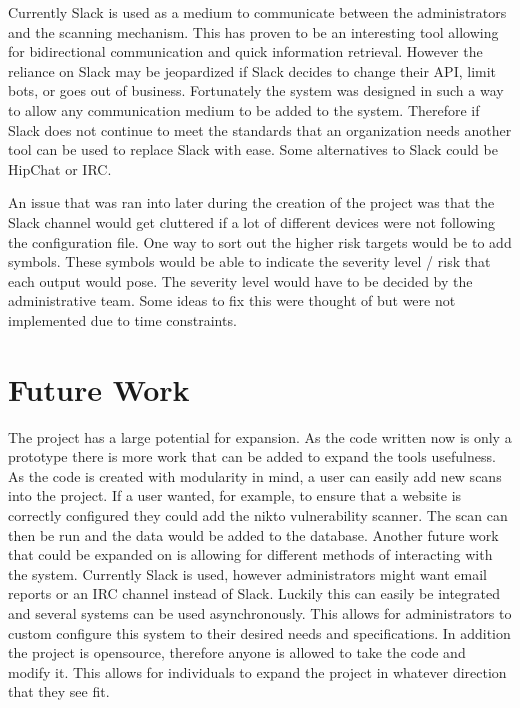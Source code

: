 \documentclass[12pt]{article}
\begin{document}
Currently Slack is used as a medium to communicate between the administrators and the scanning mechanism. This has proven to be an interesting tool allowing for bidirectional communication and quick information retrieval. However the reliance on Slack may be jeopardized if Slack decides to change their API, limit bots, or goes out of business. Fortunately the system was designed in such a way to allow any communication medium to be added to the system. Therefore if Slack does not continue to meet the standards that an organization needs another tool can be used to replace Slack with ease. Some alternatives to Slack could be HipChat or IRC.

An issue that was ran into later during the creation of the project was that the Slack channel would get cluttered if a lot of different devices were not following the configuration file. One way to sort out the higher risk targets would be to add symbols. These symbols would be able to indicate the severity level / risk that each output would pose. The severity level would have to be decided by the administrative team. Some ideas to fix this were thought of but were not implemented due to time constraints.

\section{Future Work}
The project has a large potential for expansion. As the code written now is only a prototype there is more work that can be added to expand the tools usefulness. As the code is created with modularity in mind, a user can easily add new scans into the project. If a user wanted, for example, to ensure that a website is correctly configured they could add the nikto \cite{NiktoScan} vulnerability scanner. The scan can then be run and the data would be added to the database. Another future work that could be expanded on is allowing for different methods of interacting with the system. Currently Slack is used, however administrators might want email reports or an IRC channel instead of Slack. Luckily this can easily be integrated and several systems can be used asynchronously. This allows for administrators to custom configure this system to their desired needs and specifications. In addition the project is opensource, therefore anyone is allowed to take the code and modify it. This allows for individuals to expand the project in whatever direction that they see fit.
\end{document}
